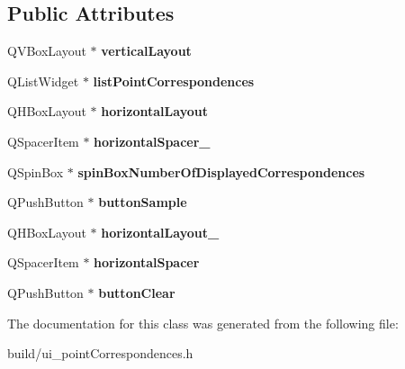 \subsection*{Public Attributes}
\begin{DoxyCompactItemize}
\item 
\hypertarget{class_ui___point_correspondences_widget_ad0fc2c0a822bce4373a78cc9d55a078f}{}Q\+V\+Box\+Layout $\ast$ {\bfseries vertical\+Layout}\label{class_ui___point_correspondences_widget_ad0fc2c0a822bce4373a78cc9d55a078f}

\item 
\hypertarget{class_ui___point_correspondences_widget_ae815003ea8f4885af4a0e26029be8b25}{}Q\+List\+Widget $\ast$ {\bfseries list\+Point\+Correspondences}\label{class_ui___point_correspondences_widget_ae815003ea8f4885af4a0e26029be8b25}

\item 
\hypertarget{class_ui___point_correspondences_widget_a1ee89124fa99a2a3c4c8d79f8127b63e}{}Q\+H\+Box\+Layout $\ast$ {\bfseries horizontal\+Layout}\label{class_ui___point_correspondences_widget_a1ee89124fa99a2a3c4c8d79f8127b63e}

\item 
\hypertarget{class_ui___point_correspondences_widget_a6ceeca2a07dbfc1c148428ef9bb74915}{}Q\+Spacer\+Item $\ast$ {\bfseries horizontal\+Spacer\+\_}\label{class_ui___point_correspondences_widget_a6ceeca2a07dbfc1c148428ef9bb74915}

\item 
\hypertarget{class_ui___point_correspondences_widget_af1b7a0bb94014c34b8f3876a085a2883}{}Q\+Spin\+Box $\ast$ {\bfseries spin\+Box\+Number\+Of\+Displayed\+Correspondences}\label{class_ui___point_correspondences_widget_af1b7a0bb94014c34b8f3876a085a2883}

\item 
\hypertarget{class_ui___point_correspondences_widget_a44cab627e582398f2e1063e4de5a7604}{}Q\+Push\+Button $\ast$ {\bfseries button\+Sample}\label{class_ui___point_correspondences_widget_a44cab627e582398f2e1063e4de5a7604}

\item 
\hypertarget{class_ui___point_correspondences_widget_a6f580fbad1bbc64390782394f1267e3d}{}Q\+H\+Box\+Layout $\ast$ {\bfseries horizontal\+Layout\+\_}\label{class_ui___point_correspondences_widget_a6f580fbad1bbc64390782394f1267e3d}

\item 
\hypertarget{class_ui___point_correspondences_widget_ae8e2f407915f190dc6d67ff89acb1aad}{}Q\+Spacer\+Item $\ast$ {\bfseries horizontal\+Spacer}\label{class_ui___point_correspondences_widget_ae8e2f407915f190dc6d67ff89acb1aad}

\item 
\hypertarget{class_ui___point_correspondences_widget_a8e4378e99c1a7a2026278964ebca219e}{}Q\+Push\+Button $\ast$ {\bfseries button\+Clear}\label{class_ui___point_correspondences_widget_a8e4378e99c1a7a2026278964ebca219e}

\end{DoxyCompactItemize}


The documentation for this class was generated from the following file\+:\begin{DoxyCompactItemize}
\item 
build/ui\+\_\+point\+Correspondences.\+h\end{DoxyCompactItemize}
